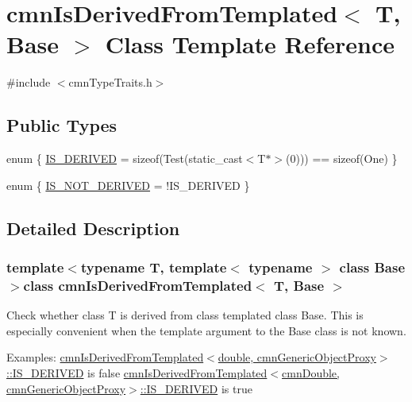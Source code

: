\hypertarget{classcmn_is_derived_from_templated}{}\section{cmn\+Is\+Derived\+From\+Templated$<$ T, Base $>$ Class Template Reference}
\label{classcmn_is_derived_from_templated}


{\ttfamily \#include $<$cmn\+Type\+Traits.\+h$>$}

\subsection*{Public Types}
\begin{DoxyCompactItemize}
\item 
enum \{ \hyperlink{classcmn_is_derived_from_templated_adf75555e9b3ea5b7cca26092a9a621bfa946c9ccdd650ead37b23ab1cb284f2ca}{I\+S\+\_\+\+D\+E\+R\+I\+V\+E\+D} = sizeof(Test(static\+\_\+cast$<$T$\ast$$>$(0))) == sizeof(One)
 \}
\item 
enum \{ \hyperlink{classcmn_is_derived_from_templated_aff833aa4b3d8a186921ab9f2ddb20887a762073f61bb9b926aba5b4f227f3e6d8}{I\+S\+\_\+\+N\+O\+T\+\_\+\+D\+E\+R\+I\+V\+E\+D} = !\+I\+S\+\_\+\+D\+E\+R\+I\+V\+E\+D
 \}
\end{DoxyCompactItemize}


\subsection{Detailed Description}
\subsubsection*{template$<$typename T, template$<$ typename $>$ class Base$>$class cmn\+Is\+Derived\+From\+Templated$<$ T, Base $>$}

Check whether class T is derived from class templated class Base. This is especially convenient when the template argument to the Base class is not known.

Examples\+: \hyperlink{classcmn_is_derived_from_templated_adf75555e9b3ea5b7cca26092a9a621bfa946c9ccdd650ead37b23ab1cb284f2ca}{cmn\+Is\+Derived\+From\+Templated$<$double, cmn\+Generic\+Object\+Proxy$>$\+::\+I\+S\+\_\+\+D\+E\+R\+I\+V\+E\+D} is false \hyperlink{classcmn_is_derived_from_templated_adf75555e9b3ea5b7cca26092a9a621bfa946c9ccdd650ead37b23ab1cb284f2ca}{cmn\+Is\+Derived\+From\+Templated$<$cmn\+Double, cmn\+Generic\+Object\+Proxy$>$\+::\+I\+S\+\_\+\+D\+E\+R\+I\+V\+E\+D} is true

